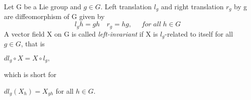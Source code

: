 \begin{definition}
 Let G be a Lie group and $g \in G$. Left translation $l_{g}$ and right translation $r_{g}$ by g are diffeomorphism of G
 given by 
 \begin{equation*}
  l_g h = gh \quad r_g = hg,\;\;\;\;\; for \; all\; h \in G
 \end{equation*}
A vector field X on G is called \textit{left-invariant} if X is $l_g$-related to itself for all $g \in G$, that is \\
\begin{center}$dl_g \circ X = X \circ l_g,$ \end{center}
 which is short for \;\;\;\;\;\;\; \begin{center}$dl_g(X_h) = X_{gh}$ for all $h \in G$.\end{center}
\end{definition}
